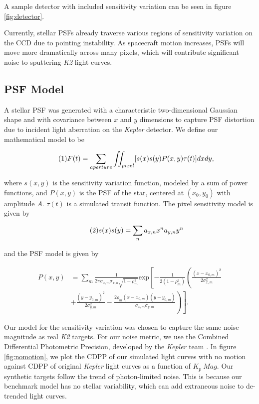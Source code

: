 \documentclass[12pt,preprint]{aastex}
\begin{document}
A sample detector with included sensitivity variation can be seen in figure \ref{fig:detector}.

Currently, stellar PSFs already traverse various regions of sensitivity variation on the CCD due to pointing instability. As spacecraft motion increases, PSFs will move more dramatically across many pixels, which will contribute significant noise to sputtering-\textit{K2} light curves.

\subsection{PSF Model}

A stellar PSF was generated with a characteristic two-dimensional Gaussian shape and with covariance between $x$ and $y$ dimensions to capture PSF distortion due to incident light aberration on the \textit{Kepler} detector. We define our mathematical model to be

\[
\tag{1}
F(t)=\sum_{aperture} \iint_{pixel} [s(x)s(y)P(x,y)\tau (t)]dxdy,\\
\]

where $s(x,y)$ is the sensitivity variation function, modeled by a sum of power functions, and $P(x,y)$ is the PSF of the star, centered at $(x_0,y_0)$ with amplitude $A$. $\tau (t)$ is a simulated transit function. The pixel sensitivity model is given by

\[
\tag{2}
s(x)s(y) = \sum_n a_{x,n}x^na_{y,n}y^n \\
\]

and the PSF model is given by

\[
\tag{3}
\begin{split}
P(x,y) & = \sum_m \frac{1}{2\pi\sigma_{x,m}\sigma_{x,n}\sqrt{1-\rho_m^2}} \text{exp}\left[ -\frac{1}{2(1-\rho_m^2)} \left( \frac{(x-x_{0,m})^2}{2\sigma_{x,m}^2} \right. \right. \\
			 & \left. \left. + \frac{(y-y_{0,m})^2}{2\sigma_{y,m}^2} - \frac{2\rho_m  (x-x_{0,m})(y-y_{0,m})}{\sigma_{x,m}\sigma_{y,m}} \right) \right].
\end{split}
\]

Our model for the sensitivity variation was chosen to capture the same noise magnitude as real \textit{K2} targets. For our noise metric, we use the Combined Differential Photometric Precision, developed by the \textit{Kepler} team \citep{2012PASP..124.1279C}. In figure \ref{fig:nomotion}, we plot the CDPP of our simulated light curves with no motion against CDPP of original \textit{Kepler} light curves as a function of $K_p\ Mag$. Our synthetic targets follow the trend of photon-limited noise. This is because our benchmark model has no stellar variability, which can add extraneous noise to de-trended light curves.
\end{document}
